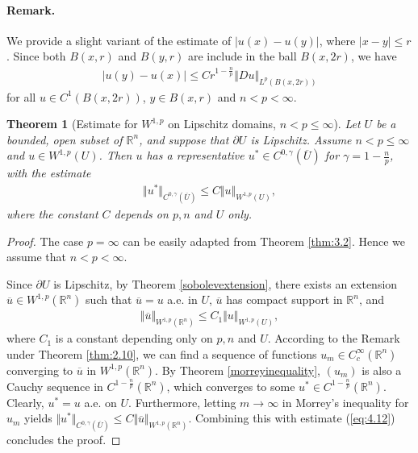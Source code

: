 \documentclass{article}
\numberwithin{equation}{section}
\newcommand{\bbR}{\mathbb{R}}
\newcommand{\ol}{\overline}
\theoremstyle{plain}
\newtheorem{theorem}{Theorem}[section]
\theoremstyle{definition}
\begin{document}
\paragraph{Remark.} We provide a slight variant of the estimate of $\vert u(x)-u(y)\vert$, where $\vert x-y\vert\leq r$. Since both $B(x,r)$ and $B(y,r)$ are include in the ball $B(x,2r)$, we have
\begin{align*}
	\vert u(y)-u(x)\vert\leq Cr^{1-\frac{n}{p}}\Vert Du\Vert_{L^p(B(x,2r))}
\end{align*} 
for all $u\in C^1(B(x,2r))$, $y\in B(x,r)$ and $n<p<\infty$.

\begin{theorem}[Estimate for $W^{1,p}$ on Lipschitz domains, $n<p\leq\infty$]\label{thm:4.8}
Let $U$ be a bounded, open subset of $\bbR^n$, and suppose that $\partial U$ is Lipschitz. Assume $n<p\leq\infty$ and $u\in W^{1,p}(U)$. Then $u$ has a representative $u^*\in C^{0,\gamma}(\ol{U})$ for $\gamma=1-\frac{n}{p}$, with the estimate
\begin{align}
	\Vert u^*\Vert_{C^{0,\gamma}(\ol{U})}\leq C\Vert u\Vert_{W^{1,p}(U)},\label{eq:4.11}
\end{align}
where the constant $C$ depends on $p,n$ and $U$ only.
\end{theorem}
\begin{proof}
The case $p=\infty$ can be easily adapted from Theorem \ref{thm:3.2}. Hence we assume that $n<p<\infty$. 

Since $\partial U$ is Lipschitz, by Theorem \ref{sobolevextension}, there exists an extension $\ol{u}\in W^{1,p}(\bbR^n)$ such that $\ol{u}=u$ a.e. in $U$, $\ol{u}$ has compact support in $\bbR^n$, and
\begin{align}
	\Vert\ol{u}\Vert_{W^{1,p}(\bbR^n)}\leq C_1\Vert u\Vert_{W^{1,p}(U)},\label{eq:4.12}
\end{align}
where $C_1$ is a constant depending only on $p,n$ and $U$. According to the Remark under Theorem \ref{thm:2.10}, we can find a sequence of functions $u_m\in C_c^\infty(\bbR^n)$ converging to $\ol{u}$ in $W^{1,p}(\bbR^n)$. By Theorem \ref{morreyinequality}, $(u_m)$ is also a Cauchy sequence in $C^{1-\frac{n}{p}}(\bbR^n)$, which converges to some $u^*\in C^{1-\frac{n}{p}}(\bbR^n)$. Clearly, $u^*=u$ a.e. on $U$. Furthermore, letting $m\to\infty$ in Morrey's inequality for $u_m$ yields $\Vert u^*\Vert_{C^{0,\gamma}(\ol{U})}\leq C\Vert\ol{u}\Vert_{W^{1,p}(\bbR^n)}$. Combining this with estimate (\ref{eq:4.12}) concludes the proof.
\end{proof}
\end{document}
